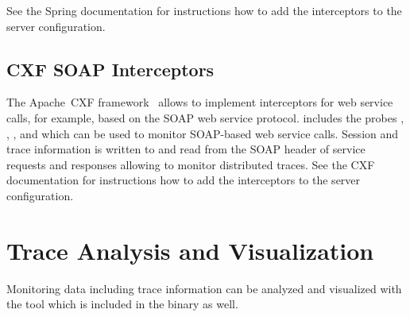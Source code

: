 See the Spring documentation for instructions how to add the interceptors %
to the server configuration.

\subsection{CXF SOAP Interceptors}\label{sec:traceAnalysis:instr:cxf}

The Apache~CXF framework~\cite{CXF-WebSite} allows to implement interceptors for web service calls, %
for example, based on the SOAP web service protocol. %
\Kieker{} includes the probes %
, %
, %
, and %
 which can be used to %
monitor SOAP-based web service calls. %
Session and trace information is written to and read from the SOAP header of %
service requests and responses allowing to monitor distributed traces. %
See the CXF documentation for instructions how to add the interceptors %
to the server configuration.

\pagebreak

\section{Trace Analysis and Visualization}\label{sec:traceAnalysisTool}

\enlargethispage{0.5cm}

Monitoring data including trace information can be analyzed and visualized with the \KiekerTraceAnalysis{} tool which is included in the \Kieker{} binary as well.\\


